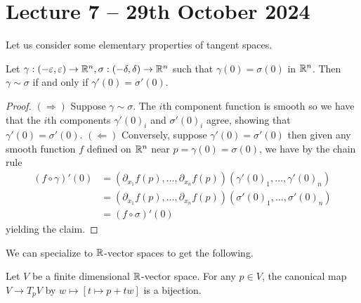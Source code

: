 \section{Lecture 7 -- 29th October 2024}\label{sec: lecture 7}
Let us consider some elementary properties of tangent spaces. 
\begin{lemma}\label{lem: equivalence of curves}
    Let $\gamma:(-\varepsilon,\varepsilon)\to\mathbb{R}^{n},\sigma:(-\delta,\delta)\to\mathbb{R}^{n}$ such that $\gamma(0)=\sigma(0)$ in $\mathbb{R}^{n}$. Then $\gamma\sim\sigma$ if and only if $\gamma'(0)=\sigma'(0)$. 
\end{lemma}
\begin{proof}
    $(\Rightarrow)$ Suppose $\gamma\sim\sigma$. The $i$th component function is smooth so we have that the $i$th components $\gamma'(0)_{i}$ and $\sigma'(0)_{i}$ agree, showing that $\gamma'(0)=\sigma'(0)$. $(\Leftarrow)$ Conversely, suppose $\gamma'(0)=\sigma'(0)$ then given any smooth function $f$ defined on $\mathbb{R}^{n}$ near $p=\gamma(0)=\sigma(0)$, we have by the chain rule
    \begin{align*}
        (f\circ\gamma)'(0)&=(\partial_{x_{1}}f(p),\dots,\partial_{x_{n}}f(p))(\gamma'(0)_{1},\dots,\gamma'(0)_{n}) \\
        &=(\partial_{x_{1}}f(p),\dots,\partial_{x_{n}}f(p))(\sigma'(0)_{1},\dots,\sigma'(0)_{n}) \\
        &=(f\circ\sigma)'(0)
    \end{align*}
    yielding the claim. 
\end{proof}
We can specialize to $\mathbb{R}$-vector spaces to get the following. 
\begin{corollary}\label{corr: map to tangent space is a bijection}
    Let $V$ be a finite dimensional $\mathbb{R}$-vector space. For any $p\in V$, the canonical map $V\to T_{p}V$ by $w\mapsto[t\mapsto p+tw]$ is a bijection. 
\end{corollary}
